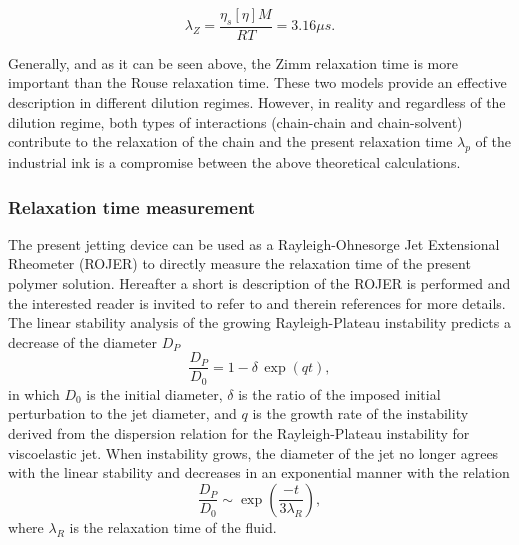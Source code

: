 \documentclass[twocolumn,10pt]{asme2ej}
\begin{document}
\begin{equation}
    \lambda_Z = \frac{\eta_s [\eta] M}{RT} = 3.16 \mu s.
    \label{zimm} 
\end{equation}

Generally, and as it can be seen above, the Zimm relaxation time is more important than the Rouse relaxation time. These two models provide an effective description in different dilution regimes. However, in reality and regardless of the dilution regime, both types of interactions (chain-chain and chain-solvent) contribute to the relaxation of the chain and the present relaxation time $\lambda_p$ of the industrial ink is a compromise between the above theoretical calculations.

\subsubsection*{Relaxation time measurement}
The present jetting device can be used as a Rayleigh-Ohnesorge Jet Extensional Rheometer (ROJER) \cite{keshavarz2015studying} to directly measure the relaxation time of the present polymer solution. Hereafter a short is description of the ROJER is performed and the interested reader is invited to refer to \cite{keshavarz2015studying} and therein references for more details.
\\
The linear stability analysis of the growing Rayleigh-Plateau instability predicts a decrease of the diameter $D_P$
\begin{equation}
    \frac{D_P}{D_0}=1-\delta \, \exp(qt),
    \label{veDecay}
\end{equation}
in which $D_0$ is the initial diameter, $\delta$ is the ratio of the imposed initial perturbation to the jet diameter, and $q$ is the growth rate of the instability derived from the dispersion relation for the Rayleigh-Plateau instability for viscoelastic jet. When instability grows, the diameter of the jet no longer agrees with the linear stability and decreases in an exponential manner with the relation 
\begin{equation}
    \frac{D_P}{D_0} \sim \exp\left(\frac{-t}{3\lambda_R}\right),
\end{equation} 
where $\lambda_R$ is the relaxation time of the fluid.
\end{document}
